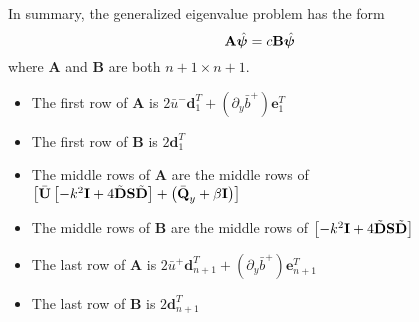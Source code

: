 \documentclass[10pt]{article}
\newcommand{\pd}[1]{\partial_{#1}}
\newcommand{\mat}[1]{\text{\bf #1}}
\begin{document}
In summary, the generalized eigenvalue problem has the form
\[\mat{A}\hat{\bm{\psi}} = c\mat{B}\hat{\bm{\psi}}\]
where {\bf A} and {\bf B} are both $n+1\times n+1$.
\begin{itemize}
\item The first row of {\bf A} is $2\bar{u}^-\bm{d}_1^T+(\pd{y}\bar{b}^+)\bm{e}_1^T$
\item The first row of {\bf B} is $2\bm{d}_1^T$
\item The middle rows of {\bf A} are the middle rows of $\left[\bar{\mat{U}}\left[-k^2\mat{I}+4\tilde{\mat{D}}\mat{S}\tilde{\mat{D}}\right] +\left(\bar{\mat{Q}}_y+\beta\mat{I}\right)\right]$
\item The middle rows of {\bf B} are the middle rows of $\left[-k^2\mat{I}+4\tilde{\mat{D}}\mat{S}\tilde{\mat{D}}\right]$
\item The last row of {\bf A} is $2\bar{u}^+\bm{d}_{n+1}^T+(\pd{y}\bar{b}^+)\bm{e}_{n+1}^T$
\item The last row of {\bf B} is $2\bm{d}_{n+1}^T$
\end{itemize}
\end{document}

